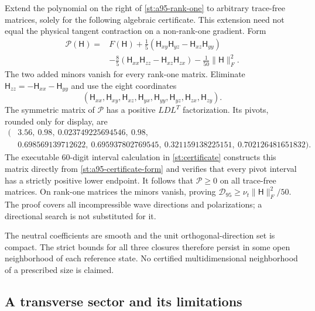 \documentclass[11pt,a4paper]{article}
\numberwithin{equation}{section}
\newcommand{\nut}{\nu_t}
\begin{document}
Extend the polynomial on the right of \cref{st:a95-rank-one} to
arbitrary trace-free matrices, solely for the following algebraic
certificate. This extension need not equal the physical tangent
contraction on a non-rank-one gradient. Form
\begin{equation}
 \begin{aligned}
 \mathcal P(\mathsf H)={}&F(\mathsf H)
 +\frac15(\mathsf H_{xy}\mathsf H_{yz}
                  -\mathsf H_{xz}\mathsf H_{yy})\\
 &-\frac85(\mathsf H_{xx}\mathsf H_{zz}
                  -\mathsf H_{xz}\mathsf H_{zx})
 -\frac1{50}\|\mathsf H\|_F^2.
 \end{aligned}
 \label{st:a95-certificate-form}
\end{equation}
The two added minors vanish for every rank-one matrix. Eliminate
$\mathsf H_{zz}=-\mathsf H_{xx}-\mathsf H_{yy}$ and use the eight
coordinates
\[
 (\mathsf H_{xx},\mathsf H_{xy},\mathsf H_{xz},\mathsf H_{yx},
   \mathsf H_{yy},\mathsf H_{yz},\mathsf H_{zx},\mathsf H_{zy}).
\]
The symmetric matrix of $\mathcal P$ has a positive $LDL^T$
factorization. Its pivots, rounded only for display, are
\begin{equation}
 \begin{aligned}
 (&3.56,\ 0.98,\ 0.023749225694546,\ 0.98,\\
 &0.698569139712622,\ 0.695937802769545,\
   0.321159138225151,\ 0.702126481651832).
 \end{aligned}
 \label{st:a95-pivots}
\end{equation}
The executable 60-digit interval calculation in
\cref{st:certificate} constructs this matrix directly from
\cref{st:a95-certificate-form} and verifies that every pivot
interval has a strictly positive lower endpoint. It follows that
$\mathcal P\ge0$ on all trace-free matrices. On rank-one matrices
the minors vanish, proving
$\mathcal D_{95}\ge\nut\|\mathsf H\|_F^2/50$.
The proof covers all incompressible wave directions and polarizations;
a directional search is not substituted for it.

The neutral coefficients are smooth and the unit orthogonal-direction
set is compact. The strict bounds for all three closures therefore
persist in some open neighborhood of each reference state.
No certified multidimensional neighborhood of a prescribed size is
claimed.

\subsection{A transverse sector and its limitations}
\label{st:transverse}
\end{document}
